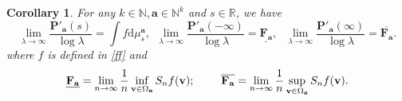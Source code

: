 \documentclass[reqno,11pt,graphicx,]{amsart}
\numberwithin{equation}{section}
\theoremstyle{plain}
\newcommand{\N}{{\mathbb N}}
\newcommand{\R}{{\mathbb R}}
\newcommand{\p}{\mathbf P}
\newcommand{\3}{\mathbf{3}}
\newcommand{\ma}{\mathbf{a}}
\newcommand{\mv}{\mathbf{v}}
\newtheorem{corollary}[theorem]{Corollary}
\begin{document}
	\begin{corollary}\label{asy-lemma} 
		For any $k\in\N,\mathbf{a}\in \N^k$ and $s\in\R$, we have 
		\begin{equation}\label{asy}
			\lim\limits_{\lambda \rightarrow \infty }\frac{\p'_{\ma}(s)}{\log
				\lambda }=\int f\mathrm{d}\mu^{\ma}_{s},\ \ \lim\limits_{\lambda \rightarrow \infty }\frac{\p'_{\ma}(-\infty)}{\log \lambda }=
			\underline{\mathbf{F}_{\ma}},\ \  \ \lim\limits_{\lambda \rightarrow \infty }\frac{\p'_{\ma}(\infty)}{\log \lambda }=\overline{\mathbf{F}_{\ma}}.
		\end{equation}
		where $f$ is defined in \eqref{ff} and  \begin{equation}  \label{def-F}
			\underline{\mathbf{F}_{\ma}}=\lim_{n\to\infty}\frac{1}{n}\inf_{\mv\in\Omega_{%
					\mathbf{a}}}S_nf(\mv);\ \ \ \ \ \ \ \overline{\mathbf{F}_{\ma}}=\lim_{n\to\infty}%
			\frac{1}{n}\sup_{\mv\in\Omega_{\ma}}S_nf(\mv).
		\end{equation}
	\end{corollary}
	
\end{document}
